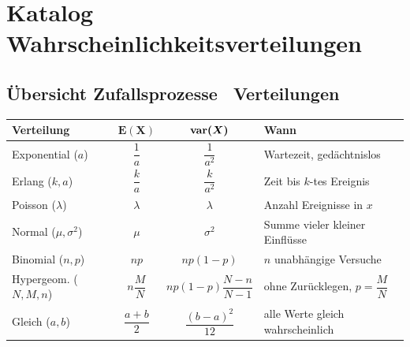 \section{Katalog Wahrscheinlichkeitsverteilungen}

\subsection[Übersicht Zufallsprozesse -- Verteilungen]{Übersicht Zufallsprozesse \textrightarrow\ Verteilungen}

\begin{center}
\end{center}

\begin{center}\footnotesize
\setlength{\tabcolsep}{3pt}
\renewcommand{\arraystretch}{1.75}
\begin{tabular}{l c c l}
	\textbf{Verteilung}			& $\bm{E(X)}$ 	& $\bm{\mathrm{var}(X)}$ 	& \textbf{Wann} \\ \hline
	Exponential ($a$)			& $\dfrac{1}{a}$ & $\dfrac{1}{a^2}$ 	& Wartezeit, gedächtnislos \\
	Erlang ($k, a$)				& $\dfrac{k}{a}$ & $\dfrac{k}{a^2}$ 	& Zeit bis $k$-tes Ereignis \\
	Poisson ($\lambda$)			& $\lambda$ 	& $\lambda$ 		& Anzahl Ereignisse in $x$ \\
	Normal ($\mu, \sigma^2$)	& $\mu$ 		& $\sigma^2$ 		& Summe vieler kleiner Einflüsse \\
	Binomial ($n, p$)			& $n p$ 		& $n p (1-p)$ 		& $n$ unabhängige Versuche \\
	Hypergeom. ($N, M, n$)		& $n \dfrac{M}{N}$ & $n p (1-p) \dfrac{N-n}{N-1}$ & ohne Zurücklegen, $p = \dfrac{M}{N}$ \\
	Gleich ($a, b$)				& $\dfrac{a+b}{2}$ & $\dfrac{(b-a)^2}{12}$ & alle Werte gleich wahrscheinlich
\end{tabular}
\end{center}

